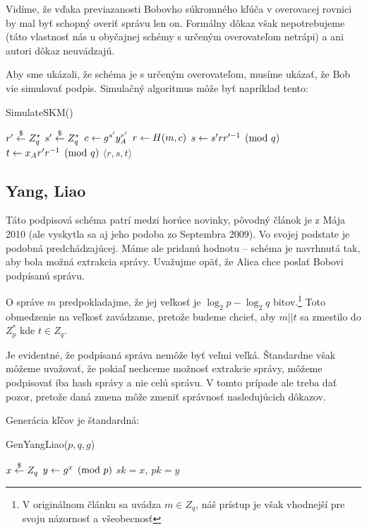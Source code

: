 \begin{poznamka}
    Vidíme, že vďaka previazanosti Bobovho súkromného kľúča v overovacej
    rovnici by mal byť schopný overiť správu len on.
    Formálny dôkaz však nepotrebujeme (táto vlastnosť nás u obyčajnej
    schémy s určeným overovateľom netrápi) a ani autori dôkaz
    neuvádzajú.
\end{poznamka}

Aby sme ukázali, že schéma je s určeným overovateľom, musíme ukázať,
že Bob vie simulovať podpis. Simulačný algoritmus môže byť napríklad
tento:
\begin{procedure}
    \caption{SimulateSKM()}
    $r' \overset{\$}{\leftarrow} Z_q^*$\;
    $s' \overset{\$}{\leftarrow} Z_q^*$\;
    $c \leftarrow g^{s'} y_A^{r'}$\;
    $r \leftarrow H(m,c)$\;
    $s \leftarrow s' r r'^{-1} \pmod{q}$\;
    $t \leftarrow x_A r' r^{-1} \pmod{q}$\;
    \Return $\langle r,s,t \rangle$\;
\end{procedure}


\subsection{Yang, Liao}
Táto podpisová schéma patrí medzi horúce novinky, pôvodný článok
\cite{designated_verifier2}
je z Mája 2010 (ale vyskytla sa aj jeho podoba zo Septembra 2009).
Vo svojej podstate je podobná predchádzajúcej.
Máme ale pridanú hodnotu -- schéma je navrhnutá tak, 
aby bola možná extrakcia správy.
Uvažujme opäť, že Alica chce poslať Bobovi podpísanú správu.

O správe $m$ predpokladajme, že jej veľkosť je $\log_2 p - \log_2 q$
bitov.\footnote{V originálnom článku sa uvádza $m\in Z_q$,
    náš prístup je však vhodnejší pre svoju názornosť a všeobecnosť}
Toto obmedzenie na veľkosť zavádzame, pretože budeme chcieť, aby
$m||t$ sa zmestilo do $Z_p^*$ kde $t \in Z_q$.

\begin{poznamka}
    Je evidentné, že podpísaná správa nemôže byť veľmi veľká.
    Štandardne však môžeme uvažovať, že
    pokiaľ nechceme možnosť extrakcie správy, 
    môžeme podpisovať iba hash správy a nie celú správu.
    V tomto prípade ale treba dať pozor, pretože daná zmena môže
    zmeniť správnosť nasledujúcich dôkazov.
\end{poznamka}

Generácia kľčov je štandardná:
\begin{procedure}
    \caption{GenYangLiao($p,q,g$)}
    $x \overset{\$}{\leftarrow} Z_q$\;
    $y \leftarrow g^x \pmod{p}$\;
    \Return $sk=x,\ pk=y$\;
\end{procedure}


